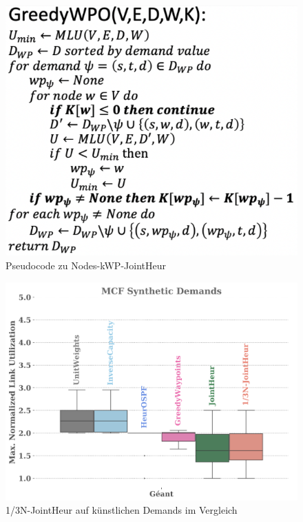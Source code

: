 \documentclass[sigconf,noacm,review]{acmart}
\begin{document}
\begin{figure}[h]
  \centering
  \includegraphics[width=\linewidth]{abbildungen/pseudo3}
  \caption{Pseudocode zu Nodes-kWP-JointHeur}
\end{figure}

\begin{figure}[h]
  \centering
  \includegraphics[width=\linewidth]{abbildungen/a31}
  \caption{1/3N-JointHeur auf künstlichen Demands im Vergleich}
\end{figure}
\end{document}
